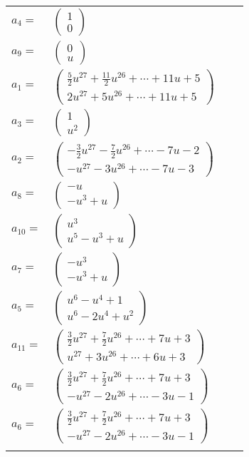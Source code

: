 \documentclass[1p]{elsarticle_modified}
\theoremstyle{definition}
\begin{document}
\begin{tabular}{m{7pt} m{180pt} m{7pt} m{180pt} }
\flushright $a_{4}=$&$\begin{pmatrix}1\\0\end{pmatrix}$ \\
\flushright $a_{9}=$&$\begin{pmatrix}0\\u\end{pmatrix}$ \\
\flushright $a_{1}=$&$\begin{pmatrix}\frac{5}{2} u^{27}+\frac{11}{2} u^{26}+\cdots+11 u+5\\2 u^{27}+5 u^{26}+\cdots+11 u+5\end{pmatrix}$ \\
\flushright $a_{3}=$&$\begin{pmatrix}1\\u^2\end{pmatrix}$ \\
\flushright $a_{2}=$&$\begin{pmatrix}-\frac{3}{2} u^{27}-\frac{7}{2} u^{26}+\cdots-7 u-2\\- u^{27}-3 u^{26}+\cdots-7 u-3\end{pmatrix}$ \\
\flushright $a_{8}=$&$\begin{pmatrix}- u\\- u^3+u\end{pmatrix}$ \\
\flushright $a_{10}=$&$\begin{pmatrix}u^3\\u^5- u^3+u\end{pmatrix}$ \\
\flushright $a_{7}=$&$\begin{pmatrix}- u^3\\- u^3+u\end{pmatrix}$ \\
\flushright $a_{5}=$&$\begin{pmatrix}u^6- u^4+1\\u^6-2 u^4+u^2\end{pmatrix}$ \\
\flushright $a_{11}=$&$\begin{pmatrix}\frac{3}{2} u^{27}+\frac{7}{2} u^{26}+\cdots+7 u+3\\u^{27}+3 u^{26}+\cdots+6 u+3\end{pmatrix}$ \\
\flushright $a_{6}=$&$\begin{pmatrix}\frac{3}{2} u^{27}+\frac{7}{2} u^{26}+\cdots+7 u+3\\- u^{27}-2 u^{26}+\cdots-3 u-1\end{pmatrix}$\\ \flushright $a_{6}=$&$\begin{pmatrix}\frac{3}{2} u^{27}+\frac{7}{2} u^{26}+\cdots+7 u+3\\- u^{27}-2 u^{26}+\cdots-3 u-1\end{pmatrix}$\\&\end{tabular}
\end{document}
